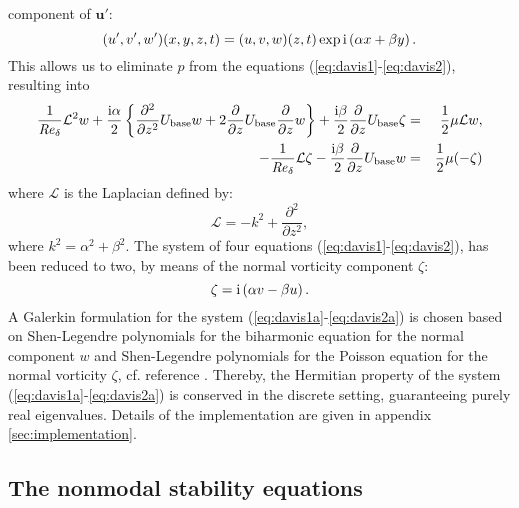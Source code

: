 \documentclass{jfm}
\newcommand\be{\begin{equation}}
\newcommand\ee{\end{equation}}
\newcommand\bea{\begin{eqnarray}}
\newcommand\eea{\end{eqnarray}}
\newcommand\base{{\rm base}}
\newcommand\Rey{\mbox{\textit{Re}}}  %
\newcommand\lap{ {\mathcal{L}}}
\newcommand\dz{ \frac{\partial}{\partial z}}
\newcommand\dzdz{ \frac{\partial^2}{\partial z^2}}
\begin{document}
component of $ \mathbf{u}' $:
\be
(u',v',w')(x,y,z,t) = (u,v,w)(z,t) \exp {\rm i} \left( \alpha x + \beta y \right).
\ee
This allows us to eliminate $ p $ from the equations (\ref{eq:davis1}-\ref{eq:davis2}), resulting into 
\bea
\frac{1}{\Rey_\delta} \lap^2 w + \frac{ {\rm i } \alpha}{2}
\left\{ \frac{\partial^2}{\partial z^2} U_\base w + 2 \dz U_\base \dz w \right\} + \frac{{\rm i} \beta}{2}  \dz U_\base \zeta  &=& \frac{1}{2}\mu \lap w,
\label{eq:davis1a}\\
-\frac{1}{\Rey_\delta} \lap \zeta - \frac{ {\rm i} \beta}{2} \dz U_\base w &=& \frac{1}{2}\mu (-\zeta) \label{eq:davis2a}
\eea
where $ \lap $ is the Laplacian defined by:
\be
\lap = -k^2 + \dzdz,
\ee
where $ k^2 = \alpha^2 + \beta^2 $. 
The system of four equations (\ref{eq:davis1}-\ref{eq:davis2}),
has been reduced to two, by means of the normal vorticity component $ \zeta $:
\be
\zeta 
= {\rm i} \left( \alpha v - \beta u \right).
\ee
A Galerkin formulation for the system (\ref{eq:davis1a}-\ref{eq:davis2a}) is 
chosen based on Shen-Legendre polynomials for the biharmonic equation
for the normal component $ w $ and Shen-Legendre polynomials 
for the Poisson equation
for the normal vorticity $ \zeta $, cf. reference \citep{Shen1994}. Thereby,
the Hermitian property of the system (\ref{eq:davis1a}-\ref{eq:davis2a}) 
is conserved in the discrete setting, guaranteeing
purely real eigenvalues. Details of
the implementation are given in appendix \ref{sec:implementation}. 

\subsection{The nonmodal stability equations}
\end{document}

